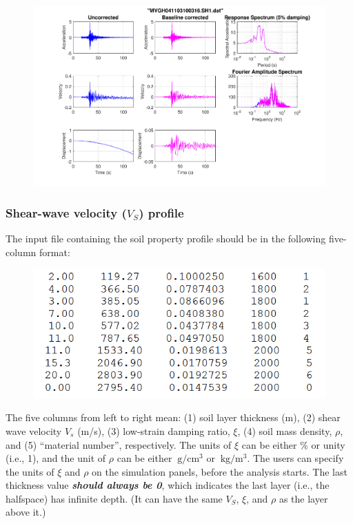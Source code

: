 \documentclass[11pt,letterpaper]{article}
\newcommand{\ein}[1]{~\mathrm{#1}}  %
\begin{document}
\begin{figure}[H]
\centering
  \includegraphics[width=.99\textwidth]{baseline_correction_result_new.pdf}\\
  \label{fig:baseline_result}
\end{figure}

\subsubsection{Shear-wave velocity ($V_S$) profile}\label{sec:soil_profile}

The input file containing the soil property profile should be in the following five-column format:

\begin{figure}[H]
\centering
  \includegraphics[width=.62\textwidth]{profile_file.png}\\
\end{figure}

The five columns from left to right mean: (1) soil layer thickness (m), (2) shear wave velocity $V_s$ (m/s), (3) low-strain damping ratio, $\xi$, (4) soil mass density, $\rho$, and (5) ``material number'', respectively. The units of $\xi$ can be either \% or unity (i.e., 1), and the unit of $\rho$ can be either $\ein{g/cm^3}$ or $\ein{kg/m^3}$. The users can specify the units of $\xi$ and $\rho$ on the simulation panels, before the analysis starts. The last thickness value \textbf{\emph{should always be 0}}, which indicates the last layer (i.e., the halfspace) has infinite depth. (It can have the same $V_S$, $\xi$, and $\rho$ as the layer above it.)
\end{document}
